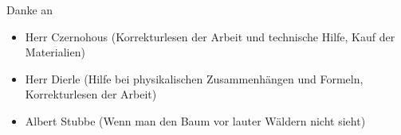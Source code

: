 Danke an \\
\begin{itemize}
    \item Herr Czernohous (Korrekturlesen der Arbeit und technische Hilfe, Kauf der Materialien)
    \item Herr Dierle (Hilfe bei physikalischen Zusammenhängen und Formeln, Korrekturlesen der Arbeit)
    \item Albert Stubbe (Wenn man den Baum vor lauter Wäldern nicht sieht)
\end{itemize}